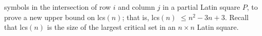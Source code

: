 \documentclass[12pt]{report}
\def\lcs#1{{\rm lcs}$(#1)$}
\begin{document}
symbols in the intersection of row $i$ and column $j$ in a partial Latin square $P$,
to prove a new upper bound on \lcs{n}; that is, \lcs{n} $\leq n^2-3n+3$.
Recall that \lcs{n} is the size of the largest critical set in
an $n \times n$ Latin square.
%
%
\end{document}
